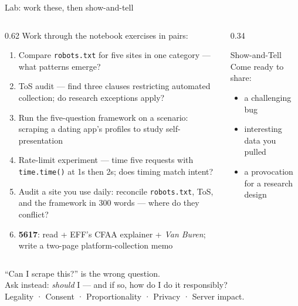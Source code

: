 \documentclass[9pt,aspectratio=169]{beamer}
\begin{document}
\begin{frame}{Lab: work these, then show-and-tell}
    \begin{columns}[T]
        \begin{column}{0.62\textwidth}
            Work through the notebook exercises in pairs:
            \begin{enumerate}\small
                \item Compare \texttt{robots.txt} for five sites in one category --- what patterns emerge?
                \item ToS audit --- find three clauses restricting automated collection; do research exceptions apply?
                \item Run the five-question framework on a scenario: scraping a dating app's profiles to study self-presentation
                \item Rate-limit experiment --- time five requests with \texttt{time.time()} at 1s then 2s; does timing match intent?
                \item Audit a site you use daily: reconcile \texttt{robots.txt}, ToS, and the framework in 300 words --- where do they conflict?
                \item[6.] \textcolor{tab-purple}{\textbf{5617}}: read \textcite{fiesler2020no} + EFF's CFAA explainer + \textit{Van Buren}; write a two-page platform-collection memo
            \end{enumerate}
        \end{column}
        \begin{column}{0.34\textwidth}
            \begin{block}{Show-and-Tell}
                \footnotesize Come ready to share:
                \begin{itemize}\footnotesize
                    \item a challenging bug
                    \item interesting data you pulled
                    \item a provocation for a research design
                \end{itemize}
            \end{block}
        \end{column}
    \end{columns}
\end{frame}

\begin{frame}[standout]
    ``Can I scrape this?'' is the wrong question.\\[0.4em]
    Ask instead: \textit{should} I --- and if so, how do I do it responsibly?\\[1em]
    {\large Legality · Consent · Proportionality · Privacy · Server impact.}
\end{frame}
\end{document}
